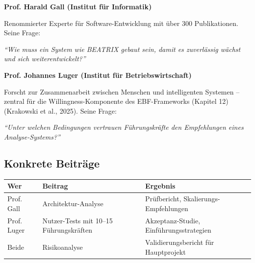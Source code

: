 \documentclass[11pt,a4paper]{article}
\begin{document}
\textbf{Prof. Harald Gall (Institut für Informatik)}

Renommierter Experte für Software-Entwicklung mit über 300 Publikationen. Seine Frage:

\textit{``Wie muss ein System wie BEATRIX gebaut sein, damit es zuverlässig wächst und sich weiterentwickelt?''}

\textbf{Prof. Johannes Luger (Institut für Betriebswirtschaft)}

Forscht zur Zusammenarbeit zwischen Menschen und intelligenten Systemen -- zentral für die Willingness-Komponente des EBF-Frameworks (Kapitel 12) (Krakowski et al., 2025). Seine Frage:

\textit{``Unter welchen Bedingungen vertrauen Führungskräfte den Empfehlungen eines Analyse-Systems?''}

\subsection{Konkrete Beiträge}

\begin{table}[h]
\centering
\begin{tabular}{@{}L{3cm}L{5cm}L{5cm}@{}}
\toprule
\textbf{Wer} & \textbf{Beitrag} & \textbf{Ergebnis} \\
\midrule
Prof. Gall & Architektur-Analyse & Prüfbericht, Skalierungs-Empfehlungen \\
Prof. Luger & Nutzer-Tests mit 10--15 Führungskräften & Akzeptanz-Studie, Einführungsstrategien \\
Beide & Risikoanalyse & Validierungsbericht für Hauptprojekt \\
\bottomrule
\end{tabular}
\end{table}

\vspace{1cm}
\end{document}

